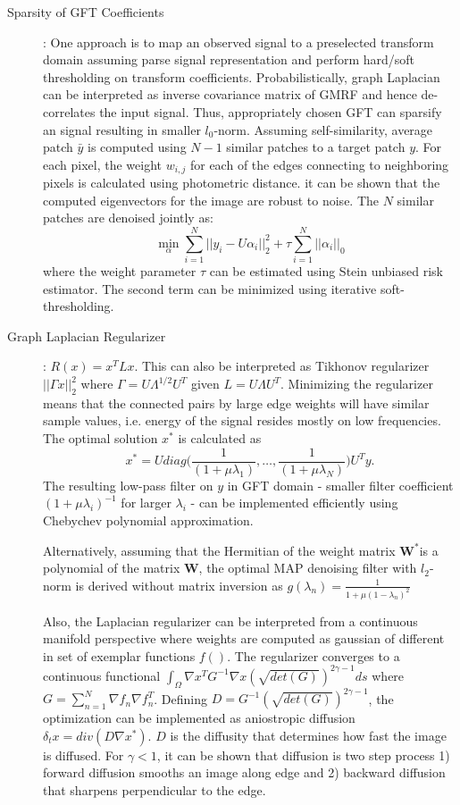 \documentclass[10pt,a4paper, nocenter]{report}
\begin{document}
	\begin{description}
		\item [Sparsity of GFT Coefficients]: One approach is to map an observed signal to a preselected transform domain assuming parse signal representation and perform hard/soft thresholding on transform coefficients. Probabilistically, graph Laplacian can be interpreted as inverse covariance matrix of GMRF and hence de-correlates the input signal. Thus, appropriately chosen GFT can sparsify an signal resulting in smaller $l_{0}$-norm. Assuming self-similarity, average patch $\bar{y}$ is computed using $N-1$ similar patches to a target patch $y$. For each pixel, the weight $w_{i,j}$ for each of the edges connecting to neighboring pixels is calculated using photometric distance. it can be shown that the computed eigenvectors for the image are robust to noise. The $N$ similar patches are denoised jointly as:
		$$ \min_{\alpha} \sum_{i=1}^{N} \lvert\lvert y_{i}-U\alpha_{i} \rvert\rvert_{2}^{2} + \tau \sum_{i=1}^{N} \lvert\lvert \alpha_{i} \rvert\rvert_{0}$$ where the weight parameter $\tau$ can be estimated using Stein unbiased risk estimator. The second term can be minimized using iterative soft-thresholding.
		
		\item[Graph Laplacian Regularizer]: $R(x)=x^{T}Lx$. This can also be interpreted as Tikhonov regularizer $\lvert \lvert \Gamma x \rvert\rvert_{2}^{2}$ where $\Gamma = U \Lambda ^{1/2} U^{T}$ given $L=U\Lambda U^{T}$. Minimizing the regularizer means that the connected pairs by large edge weights will have similar sample values, i.e. energy of the signal resides mostly on low frequencies. The optimal solution $x^{*}$ is calculated as $$ x^{*} = U diag\bigg(\frac{1}{(1+\mu\lambda_{1})}, \dots, \frac{1}{(1+\mu\lambda_{N})}\bigg)U^{T}y. $$ The resulting low-pass filter on $y$ in GFT domain - smaller filter coefficient $(1+\mu \lambda_{i})^{-1}$ for larger $\lambda_{i}$ - can be implemented efficiently using Chebychev polynomial approximation.
		
		Alternatively, assuming that the Hermitian of the weight matrix $\mathbf{W}^{*}$is a polynomial of the matrix $\mathbf{W}$, the optimal MAP denoising filter with $l_{2}$-norm is derived without matrix inversion as $g(\lambda_{n}) = \frac{1}{1+\mu(1-\lambda_{n})^{2}}$
		
		Also, the Laplacian regularizer can be interpreted from a continuous manifold perspective where weights are computed as gaussian of different in set of exemplar functions $f()$. The regularizer converges to a continuous functional $\int_{\Omega}\nabla x^{T}G^{-1}\nabla x(\sqrt{det(G)})^{2\gamma -1}ds$ where $G=\sum_{n=1}^{N}\nabla f_{n} \nabla f_{n}^{T}$. Defining $D = G^{-1}(\sqrt{det(G)})^{2\gamma -1}$, the optimization can be implemented as aniostropic diffusion $\delta_{t}x=div(D\nabla x^{*})$. $D$ is the diffusity that determines how fast the image is diffused. For $\gamma <1$, it can be shown that diffusion is two step process 1) forward diffusion smooths an image along edge and 2) backward diffusion that sharpens perpendicular to the edge. 
		

\end{description}
\end{document}
